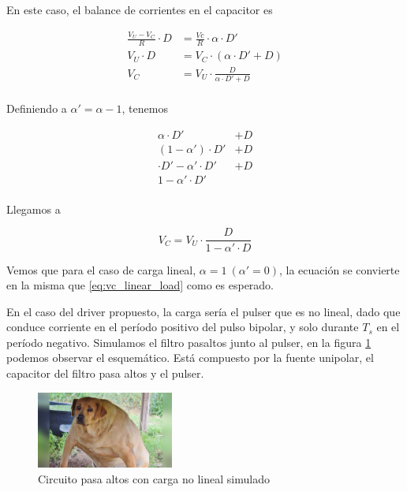 En este caso, el balance de corrientes en el capacitor es

\begin{equation}
    \label{eq:vc_non_linear_load_0}
    \begin{aligned}
        \frac{V_U-V_C}{R} \cdot D &= \frac{Vc}{R} \cdot \alpha \cdot D' \\
        V_U \cdot D &= V_C \cdot \left( \alpha \cdot D'+D \right) \\
        V_C &= V_U \cdot \frac{D}{\alpha \cdot D' + D}  \\
    \end{aligned}
\end{equation}

Definiendo a $\alpha'=\alpha-1$, tenemos

\begin{equation}
    \label{eq:vc_non_linear_load}
    \begin{aligned}
        \alpha \cdot D' &+ D \\
        (1-\alpha') \cdot D' &+ D \\
        \cdot D' - \alpha' \cdot D' &+ D \\
        1 - \alpha' \cdot D' & \\
    \end{aligned}
\end{equation}

Llegamos a

\begin{equation}
    \label{eq:vc_non_linear_load_final}
        V_C = V_U \cdot \frac{D}{1-\alpha' \cdot D}
\end{equation}

Vemos que para el caso de carga lineal, $\alpha = 1 \ (\alpha'=0)$, la ecuación
se convierte en la misma que \ref{eq:vc_linear_load} como es esperado.

En el caso del driver propuesto, la carga sería el pulser que es no lineal, dado
que conduce corriente en el período positivo del pulso bipolar, y solo durante
$T_s$ en el período negativo. Simulamos el filtro pasaltos junto al pulser, en
la figura \ref{fig:sch_highpass_non_linear_simulation} podemos observar el
esquemático. Está compuesto por la fuente unipolar, el capacitor del filtro pasa
altos y el pulser.

\begin{figure}[tbp]
    \centering
    \includegraphics[width=0.4\textwidth]{images/placeholder.jpg}
    \caption{Circuito pasa altos con carga no lineal simulado}
    \label{fig:sch_highpass_non_linear_simulation}
\end{figure}

